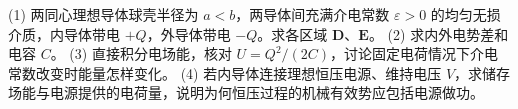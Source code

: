 (1) 两同心理想导体球壳半径为 \(a<b\)，两导体间充满介电常数 \(\varepsilon>0\) 的均匀无损介质，内导体带电 \(+Q\)，外导体带电 \(-Q\)。求各区域 \(\mathbf D\)、\(\mathbf E\)。
(2) 求内外电势差和电容 \(C\)。
(3) 直接积分电场能，核对 \(U=Q^2/(2C)\)，讨论固定电荷情况下介电常数改变时能量怎样变化。
(4) 若内导体连接理想恒压电源、维持电压 \(V\)，求储存场能与电源提供的电荷量，说明为何恒压过程的机械有效势应包括电源做功。
